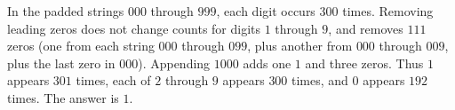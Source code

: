 In the padded strings $000$ through $999$, each digit occurs $300$ times. Removing leading zeros does not change counts for digits $1$ through $9$, and removes $111$ zeros (one from each string $000$ through $099$, plus another from $000$ through $009$, plus the last zero in $000$). Appending $1000$ adds one $1$ and three zeros. Thus $1$ appears $301$ times, each of $2$ through $9$ appears $300$ times, and $0$ appears $192$ times. The answer is $\boxed1$.
